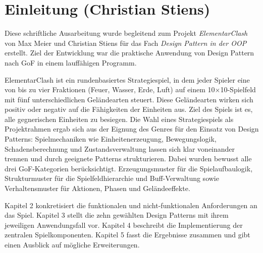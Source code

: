 \section{Einleitung (Christian Stiens)}
\label{chap:einleitung}

Diese schriftliche Ausarbeitung wurde begleitend zum Projekt \textit{ElementarClash} von Max Meier und Christian Stiens für das Fach \textit{Design Pattern in der OOP} erstellt.
Ziel der Entwicklung war die praktische Anwendung von Design Pattern nach GoF in einem lauffähigen Programm.


ElementarClash ist ein rundenbasiertes Strategiespiel, in dem jeder Spieler eine von bis zu vier Fraktionen (Feuer, Wasser, Erde, Luft) auf einem 10×10-Spielfeld mit fünf unterschiedlichen Geländearten steuert.
Diese Geländearten wirken sich positiv oder negativ auf die Fähigkeiten der Einheiten aus. Ziel des Spiels ist es, alle gegnerischen Einheiten zu besiegen.
Die Wahl eines Strategiespiels als Projektrahmen ergab sich aus der Eignung des Genres für den Einsatz von Design Patterns: Spielmechaniken wie Einheitenerzeugung, Bewegungslogik, Schadensberechnung und Zustandsverwaltung lassen sich klar voneinander trennen und durch geeignete Patterns strukturieren.
Dabei wurden bewusst alle drei GoF-Kategorien berücksichtigt. Erzeugungsmuster für die Spielaufbaulogik, Strukturmuster für die Spielfeldhierarchie und Buff-Verwaltung sowie Verhaltensmuster für Aktionen, Phasen und Geländeeffekte.


Kapitel 2 konkretisiert die funktionalen und nicht-funktionalen Anforderungen an das Spiel.
Kapitel 3 stellt die zehn gewählten Design Patterns mit ihrem jeweiligen Anwendungsfall vor.
Kapitel 4 beschreibt die Implementierung der zentralen Spielkomponenten.
Kapitel 5 fasst die Ergebnisse zusammen und gibt einen Ausblick auf mögliche Erweiterungen.

